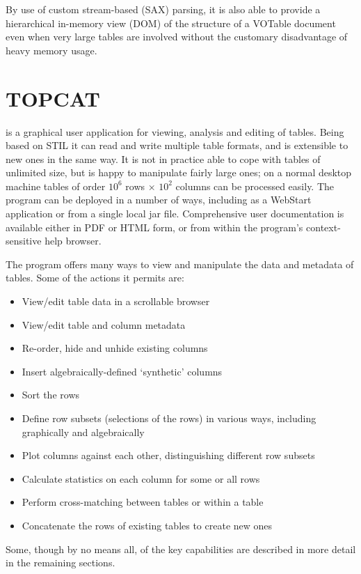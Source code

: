 \documentclass[11pt,twoside]{article}  %
\begin{document}
By use of custom stream-based (SAX) parsing, it is also able to
provide a hierarchical in-memory view (DOM) of the structure of a 
VOTable document even when very large tables are involved without
the customary disadvantage of heavy memory usage.


\section{TOPCAT}

is a graphical user application for viewing, analysis and editing
of tables.  Being based on STIL it can read and write multiple
table formats, and is extensible to new ones in the same way.
It is not in practice able to cope with tables of unlimited size,
but is happy to manipulate fairly large ones; on a normal desktop
machine tables of order $10^6$ rows $\times$ $10^2$ columns can be 
processed easily.
The program can be deployed in a number of ways, including as a WebStart 
application or from a single local jar file.
Comprehensive user documentation is available either in PDF or HTML
form, or from within the program's context-sensitive help browser.

The program offers many ways to view and manipulate the data and metadata
of tables.  Some of the actions it permits are:
\begin{itemize}
\item View/edit table data in a scrollable browser
\item View/edit table and column metadata
\item Re-order, hide and unhide existing columns
\item Insert algebraically-defined `synthetic' columns
\item Sort the rows
\item Define row subsets (selections of the rows) in various ways, 
      including graphically and algebraically
\item Plot columns against each other, distinguishing different row subsets
\item Calculate statistics on each column for some or all rows
\item Perform cross-matching between tables or within a table
\item Concatenate the rows of existing tables to create new ones
\end{itemize}
Some, though by no means all, of the key capabilities are 
described in more detail in the remaining sections.
\end{document}
